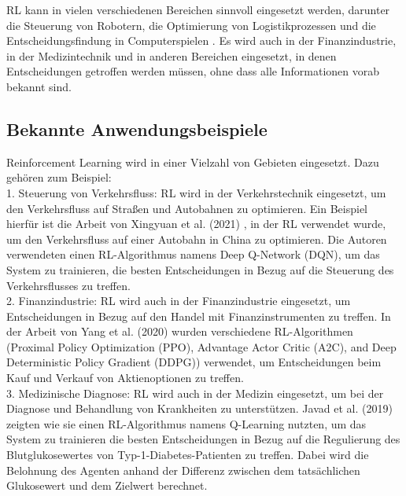\documentclass[oneside,bibliography=totocnumbered,BCOR=5mm]{scrbook}%
\theoremstyle{definition}
\theoremstyle{definition}
\theoremstyle{definition}
\theoremstyle{definition}
\theoremstyle{definition}
\theoremstyle{definition}
\begin{document}
RL kann in vielen verschiedenen Bereichen sinnvoll eingesetzt werden, darunter die Steuerung von Robotern, 
die Optimierung von Logistikprozessen und die Entscheidungsfindung in Computerspielen \autocite[Seite 1]{deepRL}. 
Es wird auch in der Finanzindustrie, in der Medizintechnik und in anderen Bereichen eingesetzt, 
in denen Entscheidungen getroffen werden müssen, ohne dass alle Informationen vorab bekannt sind. \\
\linebreak[4]


\subsection{Bekannte Anwendungsbeispiele}


Reinforcement Learning wird in einer Vielzahl von Gebieten eingesetzt. 
Dazu gehören zum Beispiel:\\


1. Steuerung von Verkehrsfluss: RL wird in der Verkehrstechnik eingesetzt, um den Verkehrsfluss auf 
Straßen und Autobahnen zu optimieren. 
Ein Beispiel hierfür ist die Arbeit von Xingyuan et al. (2021) \autocite{RLTrafficControl}, in der RL verwendet wurde, 
um den Verkehrsfluss auf einer Autobahn in China zu optimieren. 
Die Autoren verwendeten einen RL-Algorithmus namens Deep Q-Network (DQN), um das System zu trainieren, 
die besten Entscheidungen in Bezug auf die Steuerung des Verkehrsflusses zu treffen.\\


2. Finanzindustrie: RL wird auch in der Finanzindustrie eingesetzt, um Entscheidungen in Bezug 
auf den Handel mit Finanzinstrumenten zu treffen. 
In der Arbeit von Yang et al. (2020) \autocite{RLStock} wurden verschiedene RL-Algorithmen (Proximal Policy Optimization (PPO), 
Advantage Actor Critic (A2C), and Deep Deterministic Policy Gradient (DDPG)) verwendet, 
um Entscheidungen beim Kauf und Verkauf von Aktienoptionen zu treffen.\\


3. Medizinische Diagnose: RL wird auch in der Medizin eingesetzt, um bei der Diagnose und Behandlung von Krankheiten zu unterstützen. 
Javad et al. (2019) \autocite{RLDiabetes} zeigten wie sie einen RL-Algorithmus namens Q-Learning nutzten, 
um das System zu trainieren die besten Entscheidungen in Bezug auf die Regulierung des Blutglukosewertes von 
Typ-1-Diabetes-Patienten zu treffen. Dabei wird die Belohnung des Agenten anhand der Differenz zwischen dem
tatsächlichen Glukosewert und dem Zielwert berechnet.\\
\end{document}
